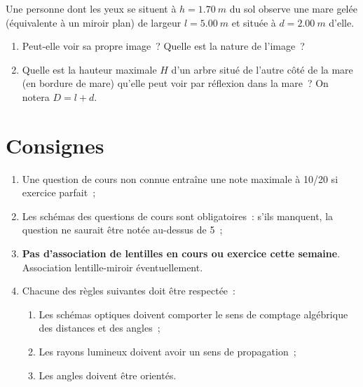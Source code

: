 \documentclass[a4paper, 12pt, final, garamond]{book}
\begin{document}
\begin{enumerate}
\begin{tcb}
		      Une personne dont les yeux se situent à $h = \SI{1.70}{m}$ du sol
		      observe une mare gelée (équivalente à un miroir plan) de largeur $l =
			      \SI{5.00}{m}$ et située à $d = \SI{2.00}{m}$ d'elle.
		      \begin{enumerate}
			      \item Peut-elle voir sa propre image~? Quelle est la nature de
			            l'image~?
			      \item Quelle est la hauteur maximale $H$ d'un arbre situé de l'autre
			            côté de la mare (en bordure de mare) qu'elle peut voir par
			            réflexion dans la mare~? On notera $D = l+d$.
		      \end{enumerate}
	      \end{tcb}
\end{enumerate}

\section{Consignes}
\begin{enumerate}
	\item Une question de cours non connue entraîne une note maximale à 10/20 si
	      exercice parfait~;
	\item Les schémas des questions de cours sont obligatoires~: s'ils manquent,
	      la question ne saurait être notée au-dessus de 5~;
	\item \textbf{Pas d'association de lentilles en cours ou exercice cette
		      semaine}. Association lentille-miroir éventuellement.
	\item Chacune des règles suivantes doit être respectée~:
	      \begin{enumerate}
		      \item Les schémas optiques doivent comporter le sens de comptage
		            algébrique des distances et des angles~;
		      \item Les rayons lumineux doivent avoir un sens de propagation~;
		      \item Les angles doivent être orientés.
	      \end{enumerate}
\end{enumerate}
\end{document}
